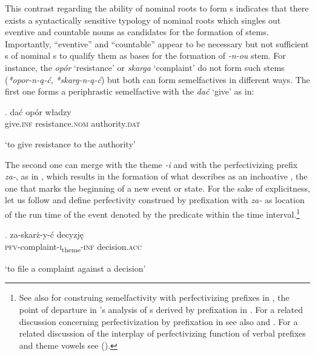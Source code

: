\noindent
This contrast regarding the ability of nominal roots to form  s indicates that there exists a syntactically sensitive typology of nominal roots which singles out eventive and countable nouns as candidates for the formation of  stems. Importantly, ``eventive'' and ``countable'' appear to be necessary but not sufficient s of nominal s to qualify them as bases for the formation of  \textit{-n-ou} stem. For instance, the  \textit{op\'or} `resistance' or \textit{skarga} `complaint' do not form such stems (\textit{*opor-n-\k{a}-\'c}, \textit{*skarg-n-\k{a}-\'c}) but both can form semelfactives in different ways. The first one forms a periphrastic semelfactive with the  \textit{da\'c} `give' as in:

\exg. 
da\'c  op\'or w\l adzy\\
give.\textsc{inf}  resistance.\textsc{nom} authority.\textsc{dat}\\
\strut `to give resistance to the authority'

The second one can merge with the  theme \textit{-i} and with the perfectivizing  prefix \textit{za-}, as in \Next, which results in the formation of what \cite[116]{Bacz2012} describes as an inchoative , the one that marks the beginning of a new event or state. For the sake of explicitness, let us follow \citet[\S6.5]{Klein1994} and define perfectivity construed by prefixation with \textit{za-} as location of the run time of the event denoted by the predicate within the time interval.\footnote{See also \cite{DickeyJanda2009} for construing semelfactivity with perfectivizing prefixes in , the point of departure in \citeauthor{Bacz2012}'s \citeyearpar{Bacz2012} analysis of s  derived by prefixation in . For a related discussion concerning perfectivization by prefixation in  see also \cite{Grzegorczykowa1997} and \citet[187--189]{Willim2006}. For a related discussion of the interplay of perfectivizing function of verbal prefixes and theme vowels  see \citeauthor{Jablonska2004} (\citeyear{Jablonska2004,Jablonska2007}).
}%

\exg. 
za-skar\.z-y-\'c decyzj\k{e}\\
\textsc{pfv}-complaint-\textsc{i}\textsubscript{theme}-\textsc{inf} decision.\textsc{acc}\\
\strut `to file a complaint against a decision'\label{zaskar}

